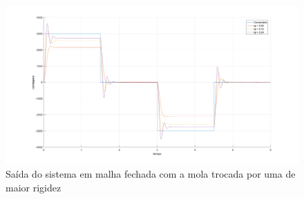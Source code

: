 \begin{figure}
    \centering
    \includegraphics[width=\textwidth]{0_img/malha_fechada_mola.png}
    \caption{Saída do sistema em malha fechada com a mola trocada por uma de maior rigidez}
    \label{fig:fechada_mola}
\end{figure}